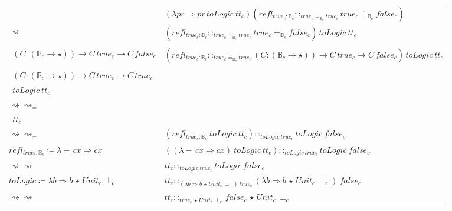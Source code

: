 \begin{sidewaysfigure}
\begin{tabular}{ll}
& $\left(\lambda pr\Rightarrow pr\,toLogic\ tt_{c}\right)\left(refl_{true_{c}:\mathbb{B}_{c}}::_{true_{c}\doteq_{\mathbb{B}_{c}}true_{c}}true_{c}\doteq_{\mathbb{B}_{c}}false_{c}\right)$\tabularnewline
$\rightsquigarrow$ & $\left(refl_{true_{c}:\mathbb{B}_{c}}::_{true_{c}\doteq_{\mathbb{B}_{c}}true_{c}}true_{c}\doteq_{\mathbb{B}_{c}}false_{c}\right)\,toLogic\ tt_{c}$\tabularnewline
\makecell[l]{$true_{c}\doteq_{\mathbb{B}_{c}}false_{c}\coloneqq$\\
  $\ \ \left(C:\left(\mathbb{B}_{c}\rightarrow\star\right)\right)\rightarrow C\,true_{c}\rightarrow C\,false_{c}$} & $\left(refl_{true_{c}:\mathbb{B}_{c}}::_{true_{c}\doteq_{\mathbb{B}_{c}}true_{c}}\left(C:\left(\mathbb{B}_{c}\rightarrow\star\right)\right)\rightarrow C\,true_{c}\rightarrow C\,false_{c}\right)\,toLogic\ tt_{c}$\tabularnewline
\makecell[l]{$true_{c}\doteq_{\mathbb{B}_{c}}true_{c}\coloneqq$\\
  $\ \ \left(C:\left(\mathbb{B}_{c}\rightarrow\star\right)\right)\rightarrow C\,true_{c}\rightarrow C\,true_{c}$} & 
  \makecell[l]{$\left(refl_{true_{c}:\mathbb{B}_{c}}::_{\left(C:\left(\mathbb{B}_{c}\rightarrow\star\right)\right)\rightarrow C\,true_{c}\rightarrow C\,true_{c}}\left(C:\left(\mathbb{B}_{c}\rightarrow\star\right)\right)\rightarrow C\,true_{c}\rightarrow C\,false_{c}\right)$\\
  $\ \ toLogic\ tt_{c}$}\tabularnewline

$\rightsquigarrow\rightsquigarrow_{=}$ & \makecell[l]{$\left(\left(refl_{true_{c}:\mathbb{B}_{c}} toLogic\right)::_{toLogic\ true_{c}\rightarrow toLogic\ true_{c}}toLogic\ true_{c}\rightarrow toLogic\ false_{c}\right)$\\
$\ \ tt_{c}$}\tabularnewline

$\rightsquigarrow\rightsquigarrow_{=}$ & $\left(refl_{true_{c}:\mathbb{B}_{c}}\ toLogic\ tt_{c}\right)::_{toLogic\ true_{c}}toLogic\ false_{c}$
\tabularnewline

$refl_{true_{c}:\mathbb{B}_{c}}\coloneqq\lambda-\,cx\Rightarrow cx$ & 
  $\left( \left(\lambda-\,cx\Rightarrow cx \right) \ toLogic\ tt_{c}\right)::_{toLogic\ true_{c}}toLogic\ false_{c}$\tabularnewline
$\rightsquigarrow\rightsquigarrow$ & $tt_{c}::_{toLogic\ true_{c}}toLogic\ false_{c}$\tabularnewline

$toLogic\coloneqq\lambda b\Rightarrow b\,\star\,Unit_{c}\,\perp_{c}$ & 
  $tt_{c}::_{\left(\lambda b\Rightarrow b\,\star\,Unit_{c}\,\perp_{c}\right)\ true_{c}}\left(\lambda b\Rightarrow b\,\star\,Unit_{c}\,\perp_{c}\right)\ false_{c}$
\tabularnewline
$\rightsquigarrow\rightsquigarrow$ & $tt_{c}::_{true_{c}\,\star\,Unit_{c}\,\perp_{c}}false_{c}\,\star\,Unit_{c}\,\perp_{c}$\tabularnewline


\end{tabular}
\end{sidewaysfigure}
